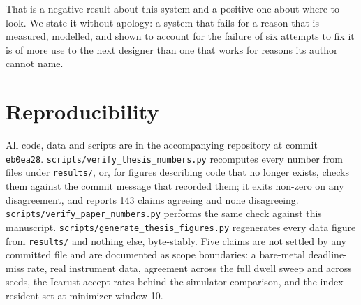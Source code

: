 \documentclass[sigconf,nonacm]{acmart}
\begin{document}
That is a negative result about this system and a positive one about where to look. We state it
without apology: a system that fails for a reason that is measured, modelled, and shown to
account for the failure of six attempts to fix it is of more use to the next designer than one
that works for reasons its author cannot name.

\section*{Reproducibility}

All code, data and scripts are in the accompanying repository at commit \texttt{eb0ea28}.
\texttt{scripts/verify\_thesis\_numbers.py} recomputes every number from files under
\texttt{results/}, or, for figures describing code that no longer exists, checks them against the
commit message that recorded them; it exits non-zero on any disagreement, and reports 143 claims
agreeing and none disagreeing. \texttt{scripts/verify\_paper\_numbers.py} performs the same check
against this manuscript. \texttt{scripts/generate\_thesis\_figures.py} regenerates every data
figure from \texttt{results/} and nothing else, byte-stably. Five claims are not settled by any
committed file and are documented as scope boundaries: a bare-metal deadline-miss rate, real
instrument data, agreement across the full dwell sweep and across seeds, the Icarust accept rates
behind the simulator comparison, and the index resident set at minimizer window 10.
\end{document}
